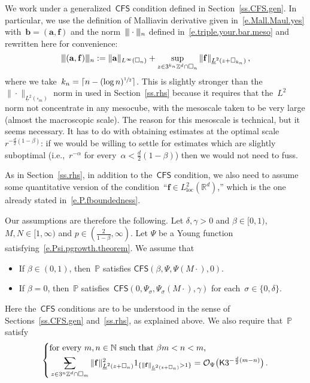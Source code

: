 \documentclass[11pt]{article} %
\makeatletter
\let\oldsquare\square %
\renewcommand{\square}{\oldsquare}
\numberwithin{equation}{section}
\theoremstyle{definition}
\let\originalleft\left
\let\originalright\right
\renewcommand{\left}{\mathopen{}\mathclose\bgroup\originalleft}
\renewcommand{\right}{\aftergroup\egroup\originalright}
\newcommand{\vertiii}{\vert\kern-0.3ex\vert\kern-0.25ex\vert}
\newcommand*{\N}{\ensuremath{\mathbb{N}}}
\newcommand*{\Z}{\ensuremath{\mathbb{Z}}}
\newcommand*{\Zd}{\ensuremath{\mathbb{Z}^d}}
\newcommand*{\Rd}{\ensuremath{\mathbb{R}^d}}
\renewcommand{\b}{\ensuremath{\mathbf{b}}}
\newcommand{\f}{\mathbf{f}}
\renewcommand{\a}{\mathbf{a}}
\newcommand{\cu}{\square}
\renewcommand{\P}{\mathbb{P}}
\renewcommand{\O}{\mathcal{O}}
\newcommand{\indc}{1}
\newcommand{\avsum}{\mathop{\mathpalette\avsuminner\relax}\displaylimits}
\newcommand\avsuminner[2]{%
  {\sbox0{$\m@th#1\sum$}%
   \vphantom{\usebox0}%
   \ooalign{%
     \hidewidth
     \smash{\,\rule[.23em]{8.8pt}{1.1pt} \relax}%
     \hidewidth\cr
     $\m@th#1\sum$\cr
   }%
  }%
}
\newcommand{\CFS}{\mathsf{CFS}}
\makeatother
\begin{document}
We work under a generalized~$\CFS$ condition defined in Section~\ref{ss.CFS.gen}. In particular, we use the definition of Malliavin derivative given in~\eqref{e.Mall.Maul.yes} with~$\b = (\a,\f)$ and the norm~$\vertiii\cdot \vertiii_n$ defined in~\eqref{e.triple.your.bar.meso} and rewritten here for convenience: 
\begin{equation}
\label{e.triple.your.bar.meso.again}
\vertiii (\a,\f) \vertiii_n:= \| \a \|_{L^\infty(\cu_n)} 
+
\sup_{z\in 3^{k_n} \Zd \cap \cu_n}
\| \f \|_{\underline{L}^2(z+\cu_{k_n})}
\,,
\end{equation}
where we take~$k_n =  \lceil n - (\log n)^{\sfrac12} \rceil$.
This is slightly stronger than the~$\| \cdot \|_{\underline{L}^2(\cu_m)}$ norm in used in Section~\ref{ss.rhs} because it requires that the~$L^2$ norm not concentrate in any mesocube, with the mesoscale taken to be very large (almost the macroscopic scale). 
The reason for this mesoscale is technical, but it seems necessary. It has to do with obtaining estimates at the optimal scale~$r^{-\frac d2(1-\beta)}$: if we would be willing to settle for estimates which are slightly suboptimal (i.e.,~$r^{-\alpha}$ for every~$\alpha<\frac d2(1-\beta)$) then we would not need to fuss. 

\smallskip

As in Section~\ref{ss.rhs}, in addition to the~$\CFS$ condition, we also need to assume some quantitative version of the condition~``$\f \in L^2_{\mathrm{loc}}(\Rd)$,'' which is the one already stated in~\eqref{e.P.fboundedness}.

\smallskip

Our assumptions are therefore the following. 
Let $\delta,\gamma> 0$ and $\beta \in [0,1)$, $M, N \in [1,\infty)$ and $ p \in (\frac{2}{1-\beta},\infty)$.  Let $\Psi$ be a Young function satisfying~\eqref{e.Psi.pgrowth.theorem}.
We assume that 
\begin{itemize}
\item If $\beta \in (0,1)$, then~$\P$ satisfies $\CFS(\beta,\Psi,\Psi(M\cdot),0)$.
\item If $\beta = 0$, then~$\P$ satisfies~$\CFS(0,\Psi_\sigma,\Psi_\sigma(M\cdot),\gamma)$ for each~$\sigma \in \{0,\delta\}$.
\end{itemize}
Here the~$\CFS$ conditions are to be understood in the sense of Sections~\ref{ss.CFS.gen} and~\ref{ss.rhs}, as explained above. 
We also require that~$\P$ satisfy
\begin{equation}
\label{e.P.fboundedness.again}
\left\{
\begin{aligned}
& \mbox{for every $m,n \in \N$ such that  $\beta m < n < m$, }
\\ & 
\avsum_{z \in 3^{n} \Z^d  \cap \cu_m} 
\| \f \|_{\underline{L}^2(z + \cu_n)}^2 \indc_{\{ \| \f \|_{\underline{L}^2(z + \cu_n)}  > 1 \} } 
= \O_\Psi\bigl(\mathsf{K}  3^{-\frac d2 (m-n) } \bigr)
\,.
\end{aligned}
\right.
\end{equation}
\end{document}
